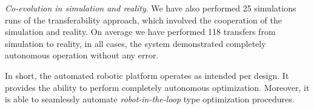 \emph{Co-evolution in simulation and reality}. We have also performed 25 simulations runs of the transferability approach, which involved the cooperation of the simulation and reality. On average we have performed 118 transfers from simulation to reality, in all cases, the system demonstrated completely autonomous operation without any error.

In short, the automated robotic platform operates as intended per design. It provides the ability to perform completely autonomous optimization. Moreover, it is able to seamlessly automate \emph{robot-in-the-loop} type optimization procedures.
